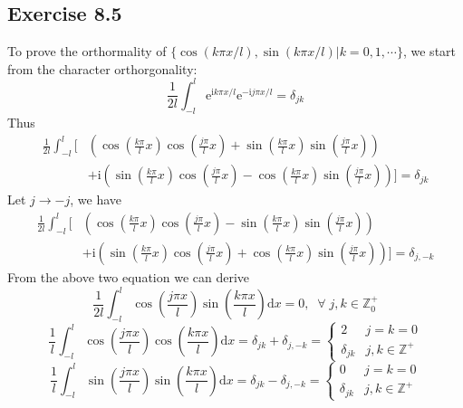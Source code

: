 \documentclass[]{ctexart}
\begin{document}
\subsection{Exercise 8.5}
To prove the orthormality of $\{\cos(k\pi x/l),\sin(k\pi x/l)|k=0,1,\cdots\}$, we start from the character orthorgonality: 
\begin{equation*}
\frac{1}{2l}\int_{-l}^l\mathrm{e}^{\mathrm{i}k\pi x/l}\mathrm{e}^{-\mathrm{i}j\pi x/l}=\delta_{jk}
\end{equation*}
Thus 
\begin{align*}
\frac{1}{2l}\int_{-l}^l\bigg[&\left(\cos\left(\frac{k\pi}{l}x\right)\cos\left(\frac{j\pi}{l}x\right)+\sin\left(\frac{k\pi}{l}x\right)\sin\left(\frac{j\pi}{l}x\right)\right)\\
&+\mathrm{i}\left(\sin\left(\frac{k\pi}{l}x\right)\cos\left(\frac{j\pi}{l}x\right)-\cos\left(\frac{k\pi}{l}x\right)\sin\left(\frac{j\pi}{l}x\right)\right)\bigg]=\delta_{jk}
\end{align*}
Let $j\to-j$, we have 
\begin{align*}
\frac{1}{2l}\int_{-l}^l\bigg[&\left(\cos\left(\frac{k\pi}{l}x\right)\cos\left(\frac{j\pi}{l}x\right)-\sin\left(\frac{k\pi}{l}x\right)\sin\left(\frac{j\pi}{l}x\right)\right)\\
&+\mathrm{i}\left(\sin\left(\frac{k\pi}{l}x\right)\cos\left(\frac{j\pi}{l}x\right)+\cos\left(\frac{k\pi}{l}x\right)\sin\left(\frac{j\pi}{l}x\right)\right)\bigg]=\delta_{j,-k}
\end{align*}
From the above two equation we can derive 
\begin{equation*}
\frac{1}{2l}\int_{-l}^l\cos\left(\frac{j\pi x}{l}\right)\sin\left(\frac{k\pi x}{l}\right)\mathrm{d}x=0,\;\;\forall\;j,k\in\mathbb Z_0^+
\end{equation*}
\begin{equation*}
\frac{1}{l}\int_{-l}^l\cos\left(\frac{j\pi x}{l}\right)\cos\left(\frac{k\pi x}{l}\right)\mathrm{d}x=\delta_{jk}+\delta_{j,-k}=\begin{cases}
2 & j=k=0\\
\delta_{jk} & j,k\in\mathbb Z^+
\end{cases}
\end{equation*}
\begin{equation*}
\frac{1}{l}\int_{-l}^l\sin\left(\frac{j\pi x}{l}\right)\sin\left(\frac{k\pi x}{l}\right)\mathrm{d}x=\delta_{jk}-\delta_{j,-k}=\begin{cases}
0 & j=k=0\\
\delta_{jk} & j,k\in\mathbb Z^+
\end{cases}
\end{equation*}
\end{document}
